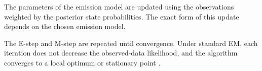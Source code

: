 \par The parameters of the emission model are updated using the observations weighted by the posterior state probabilities. 
The exact form of this update depends on the chosen emission model.


\par The E-step and M-step are repeated until convergence. 
Under standard \ac{EM}, each iteration does not decrease the observed-data likelihood, and the algorithm converges to a local optimum or stationary point \cite{Murphy2012MachineL}.